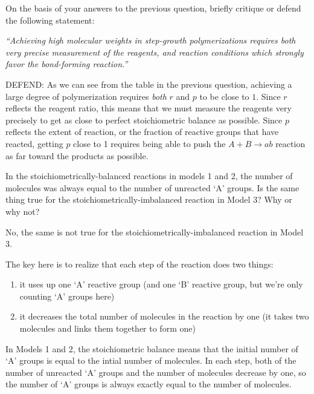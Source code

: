 \begin{activity}
\begin{ctqs}
		\question On the basis of your answers to the previous question, briefly critique or defend the following statement:
		
			\emph{``Achieving high molecular weights in step-growth polymerizations requires both very precise measurement of the reagents, and reaction conditions which strongly favor the bond-forming reaction.''}
			
			\begin{solution}[1.5in]
				DEFEND: As we can see from the table in the previous question, achieving a large degree of polymerization requires \emph{both} $r$ and $p$ to be close to $1$.
				Since $r$ reflects the reagent ratio, this means that we must measure the reagents very precisely to get as close to perfect stoichiometric balance as possible.
				Since $p$ reflects the extent of reaction, or the fraction of reactive groups that have reacted, getting $p$ close to 1 requires being able to push the $A+B\to ab$ reaction as far toward the products as possible.
			\end{solution}
			
\end{ctqs}

\begin{exercises}

		\exercise In the stoichiometrically-balanced reactions in models 1 and 2, the number of molecules was always equal to the number of unreacted `A' groups.  Is the same thing true for the stoichiometrically-imbalanced reaction in Model 3? Why or why not? %
		
			\begin{solution}
				No, the same is not true for the stoichiometrically-imbalanced reaction in Model 3.  
				
				The key here is to realize that each step of the reaction does two things:
				\begin{enumerate}
					\item it uses up one `A' reactive group (and one `B' reactive group, but we're only counting `A' groups here)
					\item it decreases the total number of molecules in the reaction by one (it takes two molecules and links them together to form one)
				\end{enumerate}
				In Models 1 and 2, the stoichiometric balance means that the initial number of `A' groups is equal to the intial number of molecules.
				In each step, both of the number of unreacted `A' groups and the number of molecules decrease by one, so the number of `A' groups is always exactly equal to the number of molecules.
				

\end{solution}
\end{exercises}
\end{activity}
